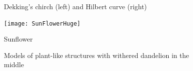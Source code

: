\begin{figure}[p]
	\hfill
	\caption{Dekking's chirch (left) and Hilbert curve (right)}
\end{figure}

\begin{figure}[p]
	\centering
	\texttt{[image: SunFlowerHuge]}
	\caption{Sunflower}
	\label{fig:rsltSunflower}
\end{figure}

\begin{figure}[p]
	\hfill
	\hfill
	\caption{Models of plant-like structures with withered dandelion in the middle}
\end{figure}
























